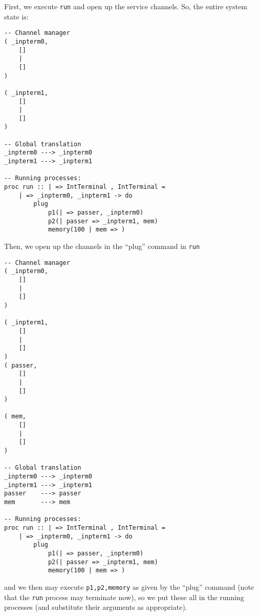 \documentclass{article}
\theoremstyle{plain}%
\theoremstyle{definition}
\theoremstyle{remark}
\begin{document}
First, we execute \verb|run| and open up the service channels.
So, the entire system state is:

\begin{verbatim}
-- Channel manager
( _inpterm0,  
    []
    |
    []
)

( _inpterm1,  
    []
    |
    []
)

-- Global translation
_inpterm0 ---> _inpterm0 
_inpterm1 ---> _inpterm1 

-- Running processes:
proc run :: | => IntTerminal , IntTerminal =
    | => _inpterm0, _inpterm1 -> do
        plug 
            p1(| => passer, _inpterm0)
            p2(| passer => _inpterm1, mem)
            memory(100 | mem => )
\end{verbatim}
Then, we open up the channels in the ``plug'' command in \verb|run|
\begin{verbatim}
-- Channel manager
( _inpterm0,  
    []
    |
    []
)

( _inpterm1,  
    []
    |
    []
)
( passer,
    []
    |
    []
)

( mem,
    []
    |
    []
)

-- Global translation
_inpterm0 ---> _inpterm0 
_inpterm1 ---> _inpterm1 
passer    ---> passer 
mem       ---> mem

-- Running processes:
proc run :: | => IntTerminal , IntTerminal =
    | => _inpterm0, _inpterm1 -> do
        plug 
            p1(| => passer, _inpterm0)
            p2(| passer => _inpterm1, mem)
            memory(100 | mem => )
\end{verbatim}

and we then may execute \verb|p1,p2,memory| as given by the ``plug'' command (note that the \verb|run| process may terminate now), so we put these all in the running processes (and 
    substitute their arguments as appropriate).
\end{document}
